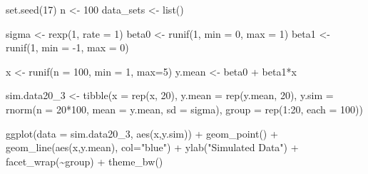 \documentclass[
]{article}
\newenvironment{Shaded}{\begin{snugshade}}{\end{snugshade}}
\newcommand{\AttributeTok}[1]{\textcolor[rgb]{0.77,0.63,0.00}{#1}}
\newcommand{\DecValTok}[1]{\textcolor[rgb]{0.00,0.00,0.81}{#1}}
\newcommand{\FunctionTok}[1]{\textcolor[rgb]{0.00,0.00,0.00}{#1}}
\newcommand{\NormalTok}[1]{#1}
\newcommand{\OtherTok}[1]{\textcolor[rgb]{0.56,0.35,0.01}{#1}}
\newcommand{\SpecialCharTok}[1]{\textcolor[rgb]{0.00,0.00,0.00}{#1}}
\newcommand{\StringTok}[1]{\textcolor[rgb]{0.31,0.60,0.02}{#1}}
\begin{document}
\begin{Shaded}
\begin{Highlighting}[]
\FunctionTok{set.seed}\NormalTok{(}\DecValTok{17}\NormalTok{)}
\NormalTok{n }\OtherTok{\textless{}{-}} \DecValTok{100}
\NormalTok{data\_sets }\OtherTok{\textless{}{-}} \FunctionTok{list}\NormalTok{()}

\NormalTok{sigma }\OtherTok{\textless{}{-}} \FunctionTok{rexp}\NormalTok{(}\DecValTok{1}\NormalTok{, }\AttributeTok{rate =} \DecValTok{1}\NormalTok{)}
\NormalTok{beta0 }\OtherTok{\textless{}{-}} \FunctionTok{runif}\NormalTok{(}\DecValTok{1}\NormalTok{, }\AttributeTok{min =} \DecValTok{0}\NormalTok{, }\AttributeTok{max =} \DecValTok{1}\NormalTok{)}
\NormalTok{beta1 }\OtherTok{\textless{}{-}} \FunctionTok{runif}\NormalTok{(}\DecValTok{1}\NormalTok{, }\AttributeTok{min =} \SpecialCharTok{{-}}\DecValTok{1}\NormalTok{, }\AttributeTok{max =} \DecValTok{0}\NormalTok{)}
  
\NormalTok{x }\OtherTok{\textless{}{-}} \FunctionTok{runif}\NormalTok{(}\AttributeTok{n =} \DecValTok{100}\NormalTok{, }\AttributeTok{min =} \DecValTok{1}\NormalTok{, }\AttributeTok{max=}\DecValTok{5}\NormalTok{)}
\NormalTok{y.mean }\OtherTok{\textless{}{-}}\NormalTok{ beta0 }\SpecialCharTok{+}\NormalTok{ beta1}\SpecialCharTok{*}\NormalTok{x}

\NormalTok{sim.data20\_3 }\OtherTok{\textless{}{-}} \FunctionTok{tibble}\NormalTok{(}\AttributeTok{x =} \FunctionTok{rep}\NormalTok{(x, }\DecValTok{20}\NormalTok{), }
              \AttributeTok{y.mean =} \FunctionTok{rep}\NormalTok{(y.mean, }\DecValTok{20}\NormalTok{), }
              \AttributeTok{y.sim =} \FunctionTok{rnorm}\NormalTok{(}\AttributeTok{n =} \DecValTok{20}\SpecialCharTok{*}\DecValTok{100}\NormalTok{, }
                            \AttributeTok{mean =}\NormalTok{ y.mean, }
                            \AttributeTok{sd =}\NormalTok{ sigma), }
              \AttributeTok{group =} \FunctionTok{rep}\NormalTok{(}\DecValTok{1}\SpecialCharTok{:}\DecValTok{20}\NormalTok{, }\AttributeTok{each =} \DecValTok{100}\NormalTok{))}


\FunctionTok{ggplot}\NormalTok{(}\AttributeTok{data =}\NormalTok{ sim.data20\_3, }\FunctionTok{aes}\NormalTok{(x,y.sim)) }\SpecialCharTok{+} 
  \FunctionTok{geom\_point}\NormalTok{() }\SpecialCharTok{+} 
  \FunctionTok{geom\_line}\NormalTok{(}\FunctionTok{aes}\NormalTok{(x,y.mean), }\AttributeTok{col=}\StringTok{"blue"}\NormalTok{) }\SpecialCharTok{+} 
  \FunctionTok{ylab}\NormalTok{(}\StringTok{"Simulated Data"}\NormalTok{) }\SpecialCharTok{+} 
  \FunctionTok{facet\_wrap}\NormalTok{(}\SpecialCharTok{\textasciitilde{}}\NormalTok{group) }\SpecialCharTok{+}
  \FunctionTok{theme\_bw}\NormalTok{()}
\end{Highlighting}
\end{Shaded}
\end{document}
